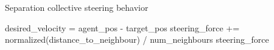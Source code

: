 \begin{algorithm}[H]
    \caption{Separation collective steering behavior}
    \begin{algorithmic}[1]
        \State desired\_velocity = agent\_pos - target\_pos
        \State steering\_force += normalized(distance\_to\_neighbour) / num\_neighbours
        \State \Return steering\_force
    \end{algorithmic}
    \label{algorithm:separation}
\end{algorithm}

